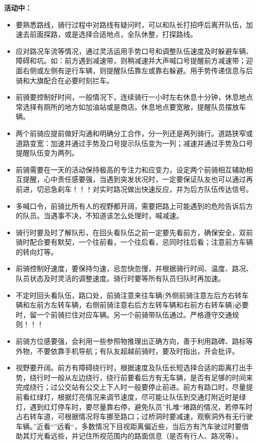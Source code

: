 \documentclass{ctexbook}
\begin{document}
\textbf{活动中：}
\begin{itemize}
\item 要熟悉路线，骑行过程中对路线有疑问时，可以和队长打招呼后离开队伍，加速去前面探路，或是选择合适地点，全队休整，打探路线。

\item 应对路况车流等情况，通过灵活运用手势口号和调整队伍速度及时躲避车辆、障碍和坑。如：前方遇到减速带，则稍减速并大声喊口号提醒前方减速带；迎面右侧或左侧有逆行车辆，则提醒队伍靠左或靠右躲避。用手势传递信息与后骑和大旗配合在必要时刻拦车。

\item 前骑要控制好时间，一般情况下，连续骑行一小时左右休息十分钟，休息地点常选择有厕所的地方如加油站或是商店。休息地点要宽敞，提醒队员摆放车辆。

\item 两个前骑应提前做好沟通和明确分工合作，分一列还是两列骑行。道路狭窄或道路变宽：加速并通过手势及口号提示队伍变为一列；减速并通过手势及口号提醒队伍变为两列。

\item 前骑需要在一天的活动保持极高的专注力和应变力，设定两个前骑相互辅助相互提醒，心中责任感要强，当遇到突发状况时，一定要保证队友也可以通过再前进，切忌急刹车！！！对实时路况做出快速反应，并为后方队伍传达信号。

\item 多喊口令，前骑比所有人的视野都开阔，需要把路上可能遇到的危险告诉后方的队员。当遇事不决，不知道该怎么处理时，喊减速。

\item 骑行时要及时了解队形，在回头看队伍之前一定要先看前方，确保安全，双前骑时配合要有默契，一个往前看，一个往后看，忌同时往后看；注意前方车辆的转向灯等。

\item 前骑控制好速度，要保持匀速，忌忽快忽慢，并根据骑行时间、温度、路况、队员状态及时灵活的调整速度。骑行时要等所有队员归队时再加速。

\item 不定时回头看队伍，路口处，前骑注意来往车辆(外侧前骑注意左后方右转车辆和左前方左转车辆，右侧前骑注意右后方左转车辆和右前方右转车辆)必要时，留一个前骑拦住对应车辆。另一个前骑带队伍通过。严格遵守交通规则！！！

\item 前骑方位感要强，会利用一些参照物推理出正确方向，善于利用路碑、路标等外物，不要依靠手机导航；有队友超越前骑时，要及时指出，开会批评。

\item 视野要开阔。前方有障碍绕行时，根据速度及队伍长短选择合适的距离打出手势，绕行时一般从左边绕行，绕行前要看后方有无车辆，是否有足够的时间来完成绕行；过公交站有公交上下人时一般要停止前进。前方有路口时，尽量提前看红绿灯，根据灯亮情况来调节速度，尽可能让队伍到交通灯附近时是绿灯，遇到红灯停车时，要尽量靠右停，避免队员''扎堆``堵路的情况，若停车时占右转车道，可根据情况将车挪至路口；过桥洞时要减速，观察洞外有无行驶车辆。''近看``''远看``，多数情况下目视距离偏近些，当后方有汽车驶过时要借助其灯光看远些，并记住所视范围内的路面信息（是否有行人、路况等）。


\end{itemize}
\end{document}
